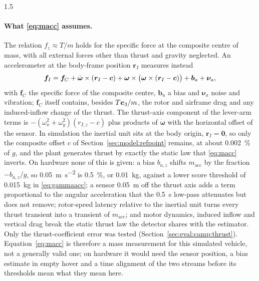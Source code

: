 \begin{spacing}{1.5}
\paragraph{What \eqref{eq:macc} assumes.} The relation $f_z\approx T/m$ holds
for the specific force at the composite centre of mass, with all external forces
other than thrust and gravity neglected. An accelerometer at the body-frame
position $\bm r_I$ measures instead
\begin{equation}
\bm f_I = \bm f_C + \dot{\bm\omega}\times(\bm r_I-\bm{c})
+ \bm\omega\times\bigl(\bm\omega\times(\bm r_I-\bm{c})\bigr) + \bm b_a + \bm\nu_a ,
\label{eq:fimu}
\end{equation}
with $\bm f_C$ the specific force of the composite centre, $\bm b_a$ a bias and
$\bm\nu_a$ noise and vibration; $\bm f_C$ itself contains, besides $T\bm{e}_3/m$, the
rotor and airframe drag and any induced-inflow change of the thrust. The
thrust-axis component of the lever-arm terms is
$-(\omega_x^2+\omega_y^2)(r_{I,z}-c)$ plus products of $\dot{\bm\omega}$ with the
horizontal offset of the sensor. In simulation the inertial unit sits at the body
origin, $\bm r_I=\bm 0$, so only the composite offset $c$ of
Section~\ref{sec:model:refpoint} remains, at about \SI{0.002}{\percent} of $g$,
and the plant generates thrust by exactly the static law that \eqref{eq:macc}
inverts. On hardware none of this is given: a bias $b_{a,z}$ shifts
$m_{\mathrm{acc}}$ by the fraction $-b_{a,z}/g$, so \SI{0.05}{\meter\per\second\squared}
is \SI{0.5}{\percent}, or \SI{0.01}{\kg}, against a lower score threshold of
\SI{0.015}{\kg} in \eqref{eq:gammaacc}; a sensor
\SI{0.05}{\meter} off the thrust axis adds a term proportional to the angular
acceleration that the \SI{0.5}{\second} low-pass attenuates but does not
remove; rotor-speed latency relative to the inertial unit turns every thrust
transient into a transient of $m_{\mathrm{acc}}$; and motor dynamics, induced
inflow and vertical drag break the static thrust law the detector shares with
the estimator. Only the thrust-coefficient error was tested
(Section~\ref{sec:eval:camp:thrust}). Equation~\eqref{eq:macc} is therefore a
mass measurement for this simulated vehicle, not a generally valid one; on
hardware it would need the sensor position, a bias estimate in empty hover and a
time alignment of the two streams before its thresholds mean what they mean
here.


\end{spacing}
